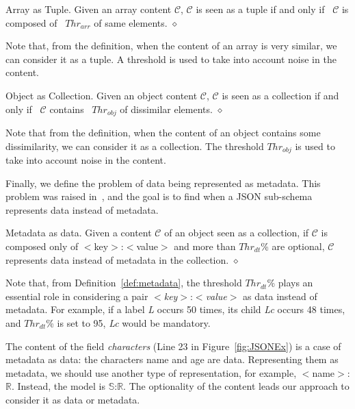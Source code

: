 \begin{definition}
 \label{def:Thrarr}
    Array as Tuple. Given an array content $\mathcal{C}$, $\mathcal{C}$ is seen as a tuple if and only if ~$\mathcal{C}$ is composed of ~$Thr_{arr}$ of same elements.   \hfill{$\diamond$}
\end{definition}

Note that, from the definition, when the content of an array is very similar, we can consider it as a tuple. 
A threshold is used to take into account noise in the content. 

\begin{definition}
    Object as Collection. Given an object content $\mathcal{C}$, $\mathcal{C}$ is seen as a collection if and only if ~$\mathcal{C}$ contains ~$Thr_{obj}$ of dissimilar elements.   \hfill{$\diamond$}
\end{definition}

Note that from the definition, when the content of an object contains some dissimilarity, we can consider it as a collection.  
The threshold $Thr_{obj}$ is used to take into account noise in the content. 

Finally, we define the problem of data being represented as metadata. This problem was raised in~\citep{Nam21,Sp+21}, and the goal is to find when a JSON sub-schema represents data instead of metadata.

\begin{definition}
    Metadata as data. Given a content \(\mathcal{C}\) of an object seen as a collection, if \(\mathcal{C}\) is composed only of $<$key$>$:$<$value$>$ and more than $Thr_{dt}$\% are optional,  \(\mathcal{C}\) represents data instead of metadata in the collection. 
    \label{def:metadata}
    \hfill{$\diamond$}
\end{definition}

Note that, from Definition~\ref{def:metadata}, the threshold  \(Thr_{dt}\)\% plays an essential role in considering a pair $<$\textit{key}$>$:$<$\textit{value}$>$ as data instead of metadata.  
For example, if a label \textit{L} occurs 50 times, its child \textit{Lc} occurs 48 times, and $Thr_{dt}$\% is set to 95, \textit{Lc} would be mandatory.
 
The content of the field \textit{characters} (Line 23 in Figure~\ref{fig:JSONEx}) is a case of metadata as data: the characters name and age are data. Representing them as metadata, we should use another type of representation, for example, $<$name$>$:\(\mathbb{R}\). 
Instead, the model is \(\mathbb{S}\):\(\mathbb{R}\). 
The optionality of the content leads our approach to consider it as data or metadata. 


